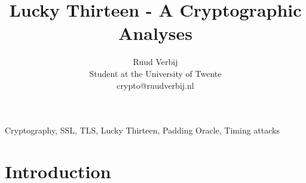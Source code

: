 \documentclass[10pt,conference,a4paper]{IEEEtran}
\title{Lucky Thirteen - A Cryptographic Analyses}
\author{Ruud Verbij \\ Student at the University of Twente \\ crypto@ruudverbij.nl}
\begin{document}
\maketitle

\begin{abstract}

\end{abstract}

\begin{IEEEkeywords}
Cryptography, SSL, TLS, Lucky Thirteen, Padding Oracle, Timing attacks
\end{IEEEkeywords}

\section{Introduction}
\label{Introduction}




\end{document}
